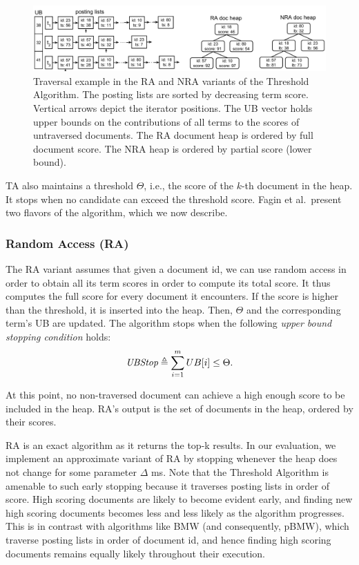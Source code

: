 \begin{figure}[tbh]
\centering
\includegraphics[width=.85\linewidth]{figures/postingsLists}
\caption{Traversal example in the RA and NRA variants of the Threshold Algorithm. The posting lists are sorted by decreasing term score. Vertical arrows depict the iterator positions. The UB vector holds upper bounds on the contributions of all terms to the scores of untraversed documents. The RA document heap is ordered by full document score. The NRA heap is ordered by partial score (lower bound).}
\label{fig:lists}
\end{figure}

TA also maintains a threshold $\Theta$, i.e., the score of the $k$-th document in the heap.
It stops when no candidate can exceed the threshold score. 
Fagin et al.\ present two flavors of the algorithm, which we now describe.

\subsubsection{Random Access (RA)} 
The RA variant assumes that given a document id, we can use random access in order to obtain all its term scores in order to compute its total score. It thus computes the full score for every document it encounters. If the score is higher than the threshold, it is inserted into the heap. Then, $\Theta$ and the corresponding term's UB are updated. The algorithm stops when 
the following \emph{upper bound stopping condition} holds:
\begin{equation} \label{eq:stop}
\textit{UBStop} \triangleq \sum_{i=1}^m UB[i] \le \Theta.
\end{equation}

At this point, no non-traversed document can achieve a high enough score to be included in the heap. RA's output is the set of documents in the heap, ordered by their scores.

RA is an exact  algorithm as it returns the top-k results. In our evaluation, we implement an approximate variant of RA by stopping whenever the heap does not change for some parameter $\Delta$ ms. 
Note that the Threshold Algorithm is amenable to such early stopping because it traverses posting lists in order of score. High scoring documents are likely to become evident early, and finding new high scoring documents becomes less and less likely as the algorithm progresses. This is in contrast with algorithms like BMW (and consequently, pBMW), which traverse posting lists in order of document id, and hence finding high scoring documents remains equally likely throughout their execution.

